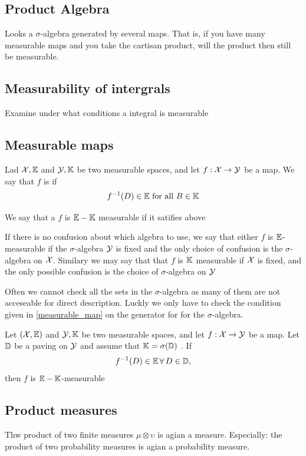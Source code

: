 \subsection{Product Algebra} %
\label{ssub:product_algebra}
Looks a \(\sigma\)-algebra generated by several maps. That is, if you have many measurable maps and you take the cartisan product, will the product then still be measurable.
\subsection{Measurability of intergrals} %
\label{sub:measurability_of_intergrals}
Examine under what conditions a integral is measurable
\subsection{Measurable maps} %
\label{sub:measurable_maps}
\begin{defn}\label{measurable_map}
Lad \({\mathcal{X}},{\mathbb{E}}\) and \({\mathcal{Y}},{\mathbb{K}}\) be two measurable spaces, and let \(f:{\mathcal{X}} \rightarrow {\mathcal{Y}}\) be a map. We say that \(f\) is  if
\[
  f^{-1}(D)\in{\mathbb{E}} \text{ for all } B\in{\mathbb{K}}
\]
\end{defn}
\begin{rem}
We say that a \(f\) is \({\mathbb{E}}-{\mathbb{K}}\) measurable if it satifies above
\end{rem}
\begin{rem}
If there is no confusion about which algebra to use, we say that either \(f\) is \({\mathbb{E}}\)-measurable if the \(\sigma\)-algebra \({\mathcal{Y}}\) is fixed and the only choice of confusion is the \(\sigma\)-algebra on \({\mathcal{X}}\). Similary we may say that that \(f\) is \({\mathbb{K}}\) measurable if \({\mathcal{X}}\) is fixed, and the only possible confusion is the choice of \(\sigma\)-algebra on \({\mathcal{Y}}\)
\end{rem}
Often we cannot check all the sets in the \(\sigma\)-algebra as many of them are not acceseable for direct description. Luckly we only have to check the condition given in \cref{measurable_map} on the generator for for the \(\sigma\)-algebra.

\begin{lem}
Let \(({\mathcal{X}},{\mathbb{E}})\) and \({\mathcal{Y}},{\mathbb{K}}\) be two measurable spaces, and let \(f:{\mathcal{X}} \rightarrow {\mathcal{Y}}\) be a map. Let \({\mathbb{D}}\) be a paving on \({\mathcal{Y}}\) and assume that \({\mathbb{K}}=\sigma({\mathbb{D}})\) . If
\[
  f^{-1}(D)\in{\mathbb{E}}\, \forall\, D\in{\mathbb{D}},
\]
then \(f\) is \({\mathbb{E}}-{\mathbb{K}}\)-measurable
\end{lem}
\subsection{Product measures} %
\label{ssub:product_measures}
Thw product of two finite measures \(\mu\otimes\upsilon\) is agian a measure. Especially: the product of two probability measures is agian a probability measure.